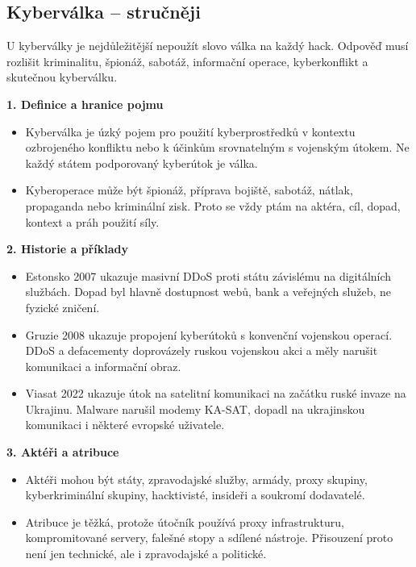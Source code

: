 
\subsection*{Kyberválka -- stručněji}
U kyberválky je nejdůležitější nepoužít slovo válka na každý hack. Odpověď musí rozlišit kriminalitu, špionáž, sabotáž, informační operace, kyberkonflikt a skutečnou kyberválku.

\textbf{1. Definice a hranice pojmu}
\begin{itemize}
  \item Kyberválka je úzký pojem pro použití kyberprostředků v kontextu ozbrojeného konfliktu nebo k účinkům srovnatelným s vojenským útokem. Ne každý státem podporovaný kyberútok je válka.
  \item Kyberoperace může být špionáž, příprava bojiště, sabotáž, nátlak, propaganda nebo kriminální zisk. Proto se vždy ptám na aktéra, cíl, dopad, kontext a práh použití síly.
\end{itemize}

\textbf{2. Historie a příklady}
\begin{itemize}
  \item Estonsko 2007 ukazuje masivní DDoS proti státu závislému na digitálních službách. Dopad byl hlavně dostupnost webů, bank a veřejných služeb, ne fyzické zničení.
  \item Gruzie 2008 ukazuje propojení kyberútoků s konvenční vojenskou operací. DDoS a defacementy doprovázely ruskou vojenskou akci a měly narušit komunikaci a informační obraz.
  \item Viasat 2022 ukazuje útok na satelitní komunikaci na začátku ruské invaze na Ukrajinu. Malware narušil modemy KA-SAT, dopadl na ukrajinskou komunikaci i některé evropské uživatele.
\end{itemize}

\textbf{3. Aktéři a atribuce}
\begin{itemize}
  \item Aktéři mohou být státy, zpravodajské služby, armády, proxy skupiny, kyberkriminální skupiny, hacktivisté, insideři a soukromí dodavatelé.
  \item Atribuce je těžká, protože útočník používá proxy infrastrukturu, kompromitované servery, falešné stopy a sdílené nástroje. Přisouzení proto není jen technické, ale i zpravodajské a politické.
\end{itemize}


